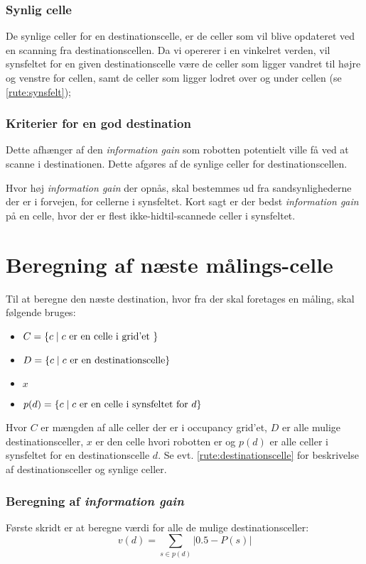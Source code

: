 \subsubsection{Synlig celle}\label{rute:synligcelle}
De synlige celler for en destinationscelle, er de celler som vil blive opdateret ved en scanning fra destinationscellen.
Da vi opererer i en vinkelret verden, vil synsfeltet for en given destinationscelle være de celler som ligger vandret til højre og venstre for cellen, samt de celler som ligger lodret over og under cellen (se \cref{rute:synsfelt});

\subsubsection{Kriterier for en god destination}
Dette afhænger af den \textit{information gain} som robotten potentielt ville få ved at scanne i destinationen.
Dette afgøres af de synlige celler for destinationscellen.

Hvor høj \textit{information gain} der opnås, skal bestemmes ud fra sandsynlighederne der er i forvejen, for cellerne i synsfeltet.
Kort sagt er der bedst \textit{information gain} på en celle, hvor der er flest ikke-hidtil-scannede celler i synsfeltet.

\section{Beregning af næste målings-celle}
Til at beregne den næste destination, hvor fra der skal foretages en måling, skal følgende bruges:
\begin{itemize}
\item{$C = \{ c \mid c \textnormal{ er en celle i grid'et } \}$}
\item{$D = \{ c \mid c \textnormal{ er en destinationscelle}\}$}
\item{$x$}
\item{$p(d) = \{ c \mid c \textnormal{ er en celle i synsfeltet for } d \}$}
\end{itemize}
Hvor $C$ er mængden af alle celler der er i occupancy grid'et, $D$ er alle mulige destinationsceller, $x$ er den celle hvori robotten er og $p(d)$ er alle celler i synsfeltet for en destinationscelle $d$.
Se evt. \cref{rute:destinationscelle} for beskrivelse af destinationsceller og synlige celler.

\subsubsection{Beregning af \textit{information gain}}
Første skridt er at beregne værdi for alle de mulige destinationsceller:
\begin{equation}
v(d) = \sum_{s \in p(d)} |0.5 - P(s)|
\end{equation}

